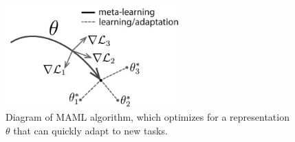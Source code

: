 \begin{figure}[tb]
    \centering
    \includegraphics[width=0.6\textwidth]{figures/images/maml_weights.jpg}
    \caption{Diagram of MAML algorithm, which optimizes for a representation $\theta$ that can quickly adapt to new tasks.}
    \label{fig:maml_weights}
\end{figure}
